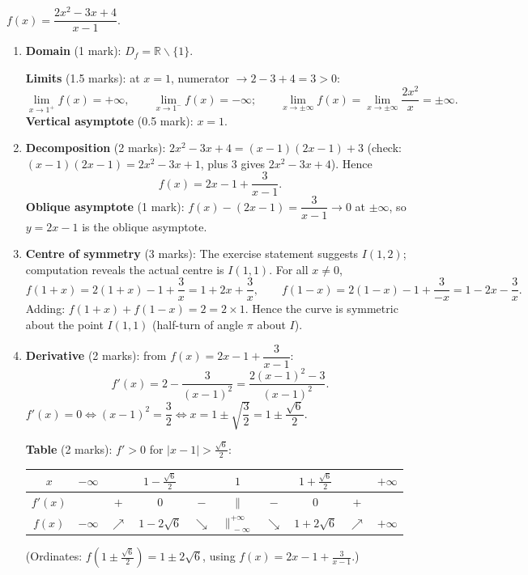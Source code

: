 \documentclass[11pt]{article}
\def\setminus{\mathbin{\backslash}}\let\smallsetminus\setminus
\begin{document}
\begin{corrige}
$f(x)=\dfrac{2x^{2}-3x+4}{x-1}$.

\begin{enumerate}
\item \textbf{Domain} (1 mark): $D_f=\mathbb{R}\setminus\{1\}$.

\textbf{Limits} (1.5 marks): at $x=1$, numerator $\to 2-3+4=3>0$:
\[ \lim_{x\to 1^{+}}f(x)=+\infty, \qquad \lim_{x\to 1^{-}}f(x)=-\infty; \qquad \lim_{x\to\pm\infty}f(x)=\lim_{x\to\pm\infty}\frac{2x^{2}}{x}=\pm\infty. \]
\textbf{Vertical asymptote} (0.5 mark): $x=1$.

\item \textbf{Decomposition} (2 marks): $2x^{2}-3x+4=(x-1)(2x-1)+3$ (check: $(x-1)(2x-1)=2x^{2}-3x+1$, plus $3$ gives $2x^{2}-3x+4$). Hence
\[ f(x)=2x-1+\frac{3}{x-1}. \]
\textbf{Oblique asymptote} (1 mark): $f(x)-(2x-1)=\dfrac{3}{x-1}\to 0$ at $\pm\infty$, so $y=2x-1$ is the oblique asymptote.

\item \textbf{Centre of symmetry} (3 marks): The exercise statement suggests $I(1,2)$; computation reveals the actual centre is $I(1,1)$. For all $x\neq 0$,
\[ f(1+x)=2(1+x)-1+\frac{3}{x}=1+2x+\frac{3}{x}, \qquad f(1-x)=2(1-x)-1+\frac{3}{-x}=1-2x-\frac{3}{x}. \]
Adding: $f(1+x)+f(1-x)=2 = 2\times 1$. Hence the curve is symmetric about the point $I(1,1)$ (half-turn of angle $\pi$ about $I$).

\item \textbf{Derivative} (2 marks): from $f(x)=2x-1+\dfrac{3}{x-1}$:
\[ f'(x)=2-\frac{3}{(x-1)^{2}}=\frac{2(x-1)^{2}-3}{(x-1)^{2}}. \]
$f'(x)=0 \iff (x-1)^{2}=\dfrac32 \iff x=1\pm\sqrt{\dfrac32}=1\pm\dfrac{\sqrt6}{2}$.

\textbf{Table} (2 marks): $f'>0$ for $|x-1|>\frac{\sqrt6}{2}$:
\begin{center}
\begin{tabular}{|c|ccccccccc|}
\hline
$x$ & $-\infty$ & & $1-\frac{\sqrt6}{2}$ & & $1$ & & $1+\frac{\sqrt6}{2}$ & & $+\infty$ \\
\hline
$f'(x)$ & & $+$ & $0$ & $-$ & $\|$ & $-$ & $0$ & $+$ & \\
\hline
$f(x)$ & $-\infty$ & $\nearrow$ & $1-2\sqrt6$ & $\searrow$ & $\|_{\ -\infty}^{+\infty}$ & $\searrow$ & $1+2\sqrt6$ & $\nearrow$ & $+\infty$ \\
\hline
\end{tabular}
\end{center}
(Ordinates: $f\!\left(1\pm\tfrac{\sqrt6}{2}\right)=1\pm 2\sqrt6$, using $f(x)=2x-1+\frac{3}{x-1}$.)


\end{enumerate}
\end{corrige}
\end{document}

